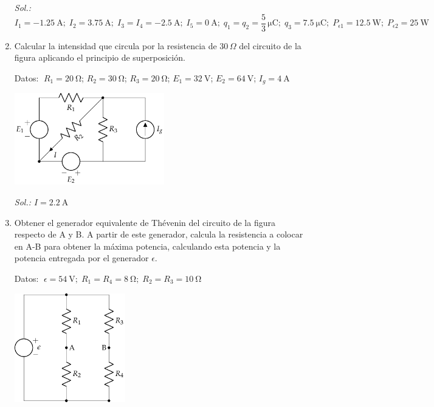 \begin{enumerate}
\begin{minipage}{0.35\linewidth}
    \end{minipage}

    \emph{Sol.:\; $I_1=\qty{-1.25}{\ampere};\; I_2=\qty{3.75}{\ampere};\; I_3=I_4=\qty{-2.5}{\ampere};\; I_5=\qty{0}{\ampere};\; q_1 = q_2 = \dfrac{5}{3}\,\si{\micro\coulomb};\; q_3 = \qty{7.5}{\micro\coulomb};\; P_{\epsilon1} = \qty{12.5}{\watt};\; P_{\epsilon2} = \qty{25}{\watt}$}


\item Calcular la intensidad que circula por la resistencia de 30$\,\Omega$ del circuito de la figura aplicando el principio de
  superposición.

  Datos: $\; R_1 = \qty{20}{\ohm}$; $R_2 = \qty{30}{\ohm}$; $R_3 = \qty{20}{\ohm}$; $E_1 = \qty{32}{\volt}$; $E_2 = \qty{64}{\volt}$; $I_g = \qty{4}{\ampere}$
  
  \vspace{-2mm}
  \begin{center}
    \includegraphics[height=4cm]{../figs/ej16_BT1.pdf}
  \end{center}  

  \vspace{-6mm}
  \emph{Sol.:\; $I=\qty{2.2}{\ampere}$}


\item Obtener el generador equivalente de Thévenin del circuito de la
  figura respecto de A y B. A partir de este generador, calcula la
  resistencia a colocar en A-B para obtener la máxima potencia,
  calculando esta potencia y la potencia entregada por el generador
  $\epsilon$.

  Datos:
  $\; \epsilon = \qty{54}{\volt};\; R_1 = R_4 = \qty{8}{\ohm};\;
  R_2 = R_3 = \qty{10}{\ohm}$

    \vspace{-1mm}
  \begin{center}
    \includegraphics[height=4.75cm]{../figs/Thevenin2}
  \end{center}


\end{enumerate}
